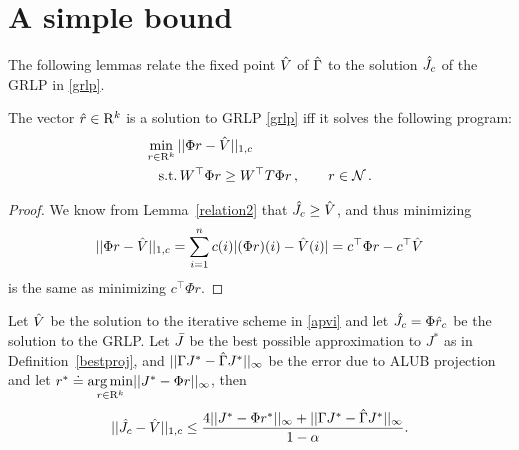 \section{A simple bound}
The following lemmas relate the fixed point $\hat{V}$ of $\hat{\Gamma}$ to the solution $\hat{J}_c$ of the GRLP in \eqref{grlp}.
\begin{lemma}\label{srw}
The vector
$\hat{r} \in \mathrm{R}^k$ is a solution to GRLP \eqref{grlp} iff it solves the following program:
\begin{align}\label{grlpeqprog}
\begin{split}
\min_{r\in \R^k}\, &||\Phi r-\hv||_{1,c}\\
\text{s.t.}\mb &\, W^\top \Phi r\geq W^\top T \Phi r\,, \qquad r\in \N\,.
\end{split}
\end{align}
\end{lemma}
\begin{proof}
We know from Lemma~\ref{relation2} that $\hat{J}_c\geq\hat{V}$, and thus minimizing 
\begin{align*}
||\Phi r-\hat{V}||_{1,c}=\sum_{i=1}^n c(i) |(\Phi r)(i)-\hat{V}(i)|=c^\top \Phi r-c^\top \hat{V}
\end{align*} 
is the same as minimizing $c^\top \Phi r$.
\end{proof}
\begin{theorem}\label{mt2}
Let $\hat{V}$ be the solution to the iterative scheme in \eqref{apvi} and let $\hat{J}_c=\Phi \hat{r}_c$ be the solution to the GRLP. Let $\bar{J}$ be the best possible approximation to $J^*$ as in Definition~\ref{bestproj}, and $||\Gamma J^* -\hat{\Gamma} J^*||_\infty$ be the error due to ALUB projection and let $r^*\doteq\underset{r\in \mathrm{R}^k}{\arg\min}||J^*-\Phi r||_\infty$, then
\begin{align}
||\hat{J}_c-\hat{V}||_{1,c}\leq\frac{4||J^*-\Phi r^*||_\infty+||\Gamma J^*-\hat{\Gamma} J^*||_\infty}{1-\alpha}.
\end{align}
\end{theorem}
